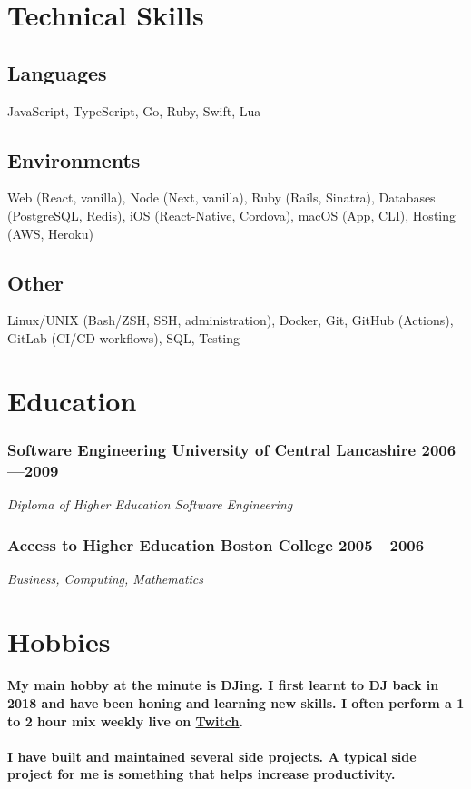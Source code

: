 \documentclass[a4paper]{article}
\newcommand{\datedsubsection}[2]{
  \subsubsection{#1 \hfill \textbf{#2}}
}
\begin{document}
\section{Technical Skills}

\subsection{Languages} JavaScript, TypeScript, Go, Ruby, Swift, Lua

\subsection{Environments} Web (React, vanilla), Node (Next, vanilla), Ruby (Rails, Sinatra), Databases (PostgreSQL, Redis), iOS (React-Native, Cordova), macOS (App, CLI), Hosting (AWS, Heroku)

\subsection{Other} Linux/UNIX (Bash/ZSH, SSH, administration), Docker, Git, GitHub (Actions), GitLab (CI/CD workflows), SQL, Testing

\clearpage

\section{Education}

\datedsubsection{\textbf{Software Engineering} University of Central Lancashire}{2006---2009}
\textit{Diploma of Higher Education Software Engineering}

\datedsubsection{\textbf{Access to Higher Education} Boston College}{2005---2006}
\textit{Business, Computing, Mathematics}

\section{Hobbies}
\paragraph{My main hobby at the minute is DJing. I first learnt to DJ back in 2018 and have been honing and learning new skills. I often perform a 1 to 2 hour mix weekly live on \href{https://twitch.tv/iamdjriff}{Twitch}.}

\paragraph{I have built and maintained several side projects. A typical side project for me is something that helps increase productivity.}
\end{document}
